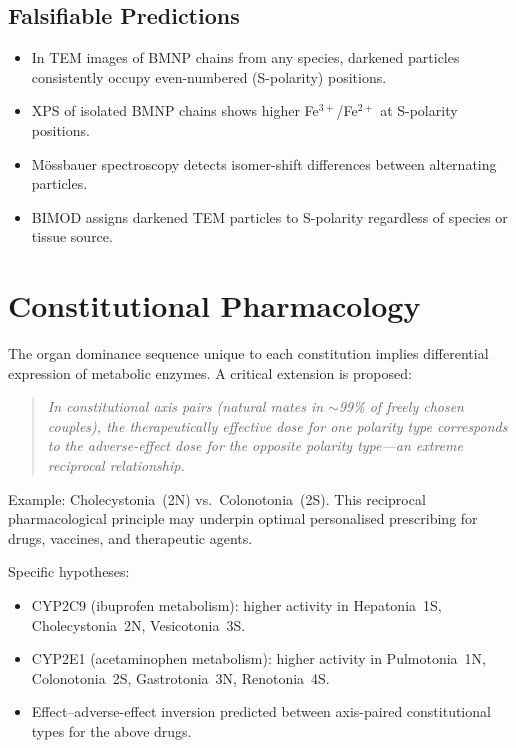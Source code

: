 \documentclass[12pt,a4paper]{article}
\begin{document}
\subsection{Falsifiable Predictions}
\begin{itemize}
  \item In TEM images of BMNP chains from any species, darkened
        particles consistently occupy even-numbered (S-polarity) positions.
  \item XPS of isolated BMNP chains shows higher Fe$^{3+}$/Fe$^{2+}$
        at S-polarity positions.
  \item M\"{o}ssbauer spectroscopy detects isomer-shift differences
        between alternating particles.
  \item BIMOD assigns darkened TEM particles to S-polarity regardless
        of species or tissue source.
\end{itemize}

\section{Constitutional Pharmacology}

The organ dominance sequence unique to each constitution implies
differential expression of metabolic enzymes.  A critical extension is
proposed:

\begin{quote}
\textit{In constitutional axis pairs (natural mates in $\sim$99\% of
freely chosen couples), the therapeutically effective dose for one
polarity type corresponds to the adverse-effect dose for the opposite
polarity type---an extreme reciprocal relationship.}
\end{quote}

Example: Cholecystonia~(2N) vs.\ Colonotonia~(2S).
This reciprocal pharmacological principle may underpin optimal
personalised prescribing for drugs, vaccines, and therapeutic agents.

Specific hypotheses:
\begin{itemize}
  \item CYP2C9 (ibuprofen metabolism): higher activity in
        Hepatonia~1S, Cholecystonia~2N, Vesicotonia~3S.
  \item CYP2E1 (acetaminophen metabolism): higher activity in
        Pulmotonia~1N, Colonotonia~2S, Gastrotonia~3N, Renotonia~4S.
  \item Effect--adverse-effect inversion predicted between axis-paired
        constitutional types for the above drugs.
\end{itemize}
\end{document}
